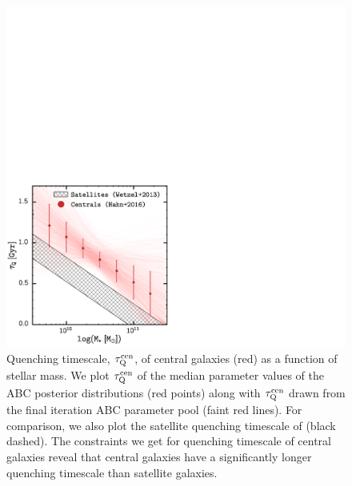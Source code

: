 \begin{figure}
\begin{center}
\includegraphics[width=\textwidth]{figs/cenq/tau_ABC_posterior_RHOssfrfq_TinkerFq_Std_updated_prior.pdf}
\caption{Quenching timescale, $\tau_\mathrm{Q}^\mathrm{cen}$, of central galaxies (red) 
as a function of stellar mass. We plot $\tau_\mathrm{Q}^\mathrm{cen}$ of the median parameter values 
of the ABC posterior distributions (red points) along with $\tau_\mathrm{Q}^\mathrm{cen}$ drawn from 
the final iteration ABC parameter pool (faint red lines). For comparison, we also 
plot the satellite quenching timescale of \cite{Wetzel:2014aa} (black dashed). 
The constraints we
get for quenching timescale of central galaxies reveal that central galaxies 
have a significantly longer quenching timescale than satellite galaxies.} 
\label{fig:abc_tau}
\end{center}
\end{figure}


